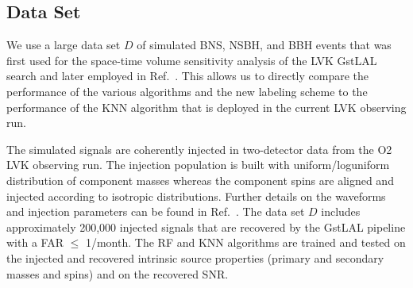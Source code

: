 \subsection{Data Set} \label{dataset}

We use a large data set $D$ of simulated \ac{BNS}, \ac{NSBH}, and \ac{BBH} events that was first used for the space-time volume sensitivity analysis of the \ac{LVK} GstLAL search
\cite{Sachdev:2019vvd,PhysRevD.95.042001,Sachdev:2020lfd} and later employed in Ref.~\cite{Chatterjee:2019avs}. This allows us to directly compare the performance of the various
algorithms and the new labeling scheme to the performance of the \ac{KNN} algorithm that is deployed in the current \ac{LVK} observing run. 

The simulated signals are coherently injected in two-detector data from the \ac{O2} \ac{LVK} observing run. The injection population is built with uniform/loguniform distribution of
component masses whereas the component spins are aligned and injected according to isotropic distributions. Further details on the waveforms and injection parameters can be found in
Ref.~\cite{Chatterjee:2019avs}. The data set $D$ includes approximately 200,000 injected signals that are recovered by the GstLAL pipeline with a \ac{FAR} $\le$ 1/month. The \ac{RF} and
\ac{KNN} algorithms are trained and tested on the injected and recovered intrinsic source properties (primary and secondary masses and spins) and on the recovered \ac{SNR}. 

